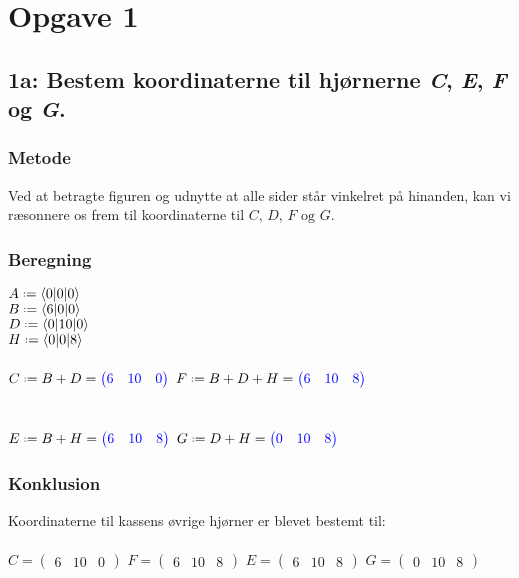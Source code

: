 \documentclass[../main.tex]{subfiles}
\begin{document}
\section*{Opgave 1}
\subsection*{1a: Bestem koordinaterne til hjørnerne \textit{C}, \textit{E}, \textit{F} og \textit{G}.}
    \subsubsection*{Metode}
        Ved at betragte figuren og udnytte at alle sider står vinkelret på hinanden, kan vi ræsonnere os frem til koordinaterne til \(C,\, D,\, F \text{ og } G\).
    \subsubsection*{Beregning}
        \(A \defeq \langle 0{\vert 0\vert}0 \rangle\)\\
        \(B \defeq \langle 6{\vert 0\vert}0 \rangle\)\\
        \(D \defeq \langle 0{\vert 10\vert}0\rangle\)\\
        \(H \defeq \langle 0{\vert 0\vert}8 \rangle\)\\\\
        \(C \defeq B + D = \textcolor{blue}{\begin{pmatrix} 6 & 10& 0\end{pmatrix}}\)\hspace*{3 cm}
        \(F \defeq B + D + H =\textcolor{blue}{\begin{pmatrix} 6& 10& 8\end{pmatrix}}\)\\\\\\
        \(E \defeq B + H = \textcolor{blue}{\begin{pmatrix} 6&10&8\end{pmatrix}}\)\hspace*{3 cm}
        \(G \defeq D + H = \textcolor{blue}{\begin{pmatrix} 0& 10& 8\end{pmatrix}}\)
    \subsubsection*{Konklusion}
        Koordinaterne til kassens øvrige hjørner er blevet bestemt til:\\\\
        \(C = \begin{pmatrix} 6 & 10 & 0\end{pmatrix}\)\hspace*{1.4 cm}
        \(F =\begin{pmatrix} 6 & 10 & 8\end{pmatrix}\)\hspace*{1.4 cm}
        \(E = \begin{pmatrix} 6 & 10 & 8\end{pmatrix}\)\hspace*{1.4 cm}
        \(G = \begin{pmatrix} 0 & 10 & 8\end{pmatrix}\)
\clearpage
\end{document}
